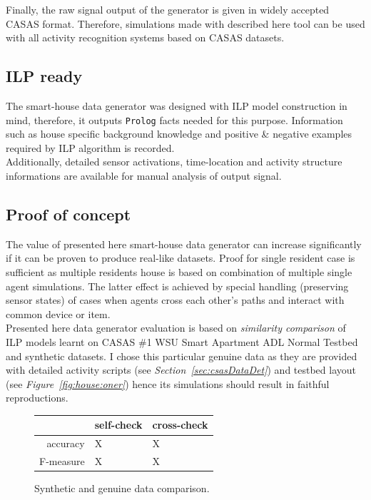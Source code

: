 \documentclass[10pt, a4paper, pdflatex, leqno, twoside, openright]{report}
\begin{document}
Finally, the raw signal output of the generator is given in widely accepted CASAS format. Therefore, simulations made with described here tool can be used with all activity recognition systems based on CASAS datasets.

    \subsection{ILP ready}
The smart-house data generator was designed with ILP model construction in mind, therefore, it outputs \texttt{Prolog} facts needed for this purpose. Information such as house specific background knowledge and positive \& negative examples required by ILP algorithm is recorded.\\
Additionally, detailed sensor activations, time-location and activity structure informations are available for manual analysis of output signal.

    \subsection{Proof of concept}
The value of presented here smart-house data generator can increase significantly if it can be proven to produce real-like datasets. Proof for single resident case is sufficient as multiple residents house is based on combination of multiple single agent simulations. The latter effect is achieved by special handling (preserving sensor states) of cases when agents cross each other's paths and interact with common device or item.\\

Presented here data generator evaluation is based on \emph{similarity comparison} of ILP models learnt on CASAS \#1 WSU Smart Apartment ADL Normal Testbed and synthetic datasets. I chose this particular genuine data as they are provided with detailed activity scripts (see \emph{Section~\ref{sec:csasDataDet}}) and testbed layout (see \emph{Figure~\ref{fig:house:oner}}) hence its simulations should result in faithful reproductions.\\

\begin{figure}[htb]
  \centering
  \begin{tabular}{ r | l l }
 & self-check & cross-check\\
\hline
accuracy & X & X\\
F-measure & X & X\\
  \end{tabular}
  \caption{Synthetic and genuine data comparison.\label{tab:proofGen}}
\end{figure}
\end{document}
